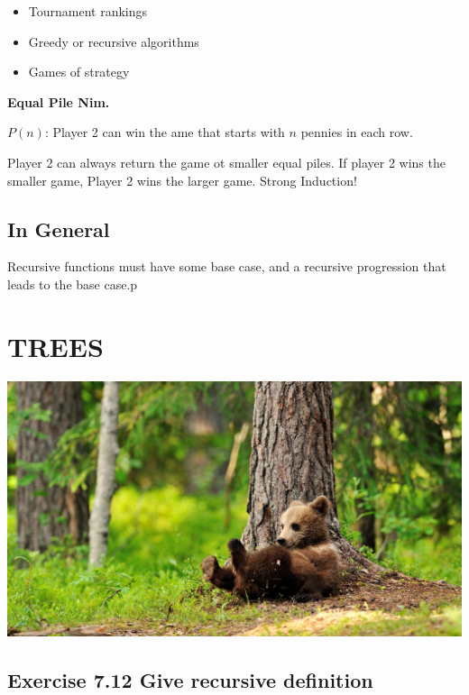 \documentclass{article}
\begin{document}
\begin{itemize}
    \item Tournament rankings \\
    \item Greedy or recursive algorithms \\
    \item Games of strategy
\end{itemize}

\noindent\textbf{Equal Pile Nim.}

\begin{centering}
$P(n)$: Player 2 can win the ame that starts with $n$ pennies in each row.
\end{centering}

Player 2 can always return the game ot smaller equal piles. If player 2 wins the smaller game, Player 2 wins the larger game. Strong Induction!

\subsection*{In General}

Recursive functions must have some base case, and a recursive progression that leads to the base case.p

\newpage

\section*{TREES}

\includegraphics[width=\textwidth]{baby-animals-tree-trunk-bears-cubs-brown-cutest-zoo-1920x1080.jpg}

\subsection*{Exercise 7.12 \normalsize Give recursive definition}
\end{document}
